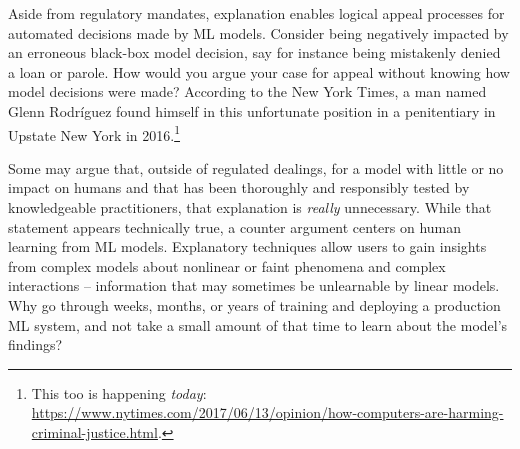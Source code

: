 \documentclass[sigconf]{acmart}
\begin{document}
Aside from regulatory mandates, explanation enables logical appeal processes for automated decisions made by ML models. Consider being negatively impacted by an erroneous black-box model decision, say for instance being mistakenly denied a loan or parole. How would you argue your case for appeal without knowing how model decisions were made? According to the New York Times, a man named Glenn Rodr\'iguez found himself in this unfortunate position in a penitentiary in Upstate New York in 2016.\footnote{This too is happening \textit{today}: \url{https://www.nytimes.com/2017/06/13/opinion/how-computers-are-harming-criminal-justice.html}.}

Some may argue that, outside of regulated dealings, for a model with little or no impact on humans and that has been thoroughly and responsibly tested by knowledgeable practitioners, that explanation is \textit{really} unnecessary. While that statement appears technically true, a counter argument centers on human learning from ML models. Explanatory techniques allow users to gain insights from complex models about nonlinear or faint phenomena and complex interactions -- information that may sometimes be unlearnable by linear models. Why go through weeks, months, or years of training and deploying a production ML system, and not take a small amount of that time to learn about the model's findings?
\end{document}
